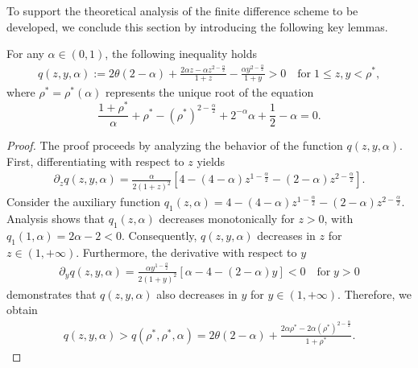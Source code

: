 \documentclass{siamart171218}
\theoremstyle{remark}
\theoremstyle{example}
\numberwithin{equation}{section}
\begin{document}
To support the theoretical analysis of the finite difference scheme to be developed, we conclude this section by introducing the following key lemmas.
\begin{lemma}\label{Le.2.2}
 For any $\alpha \in (0,1)$, the following inequality holds
\begin{align*}
q(z,y,\alpha):=2\theta(2-\alpha)+\frac{2\alpha z-\alpha z^{2-\frac{\alpha}{2}}}{1+z}-\frac{\alpha y^{2-\frac{\alpha}{2}}}{1+y}>0 \quad \text{for}\; 1\leq z,y<\rho^*,
\end{align*}
where $\rho^* = \rho^*(\alpha)$ represents the unique root of the equation $$\frac{1+\rho^*}{\alpha}+\rho^*-(\rho^*)^{2-\frac{\alpha}{2}}
+2^{-\alpha}\alpha+\frac{1}{2}-\alpha=0.$$
\end{lemma}

\begin{proof}
The proof proceeds by analyzing the behavior of the function $q(z,y,\alpha)$. First, differentiating with respect to $z$ yields
\begin{align*}
\partial_z q(z,y,\alpha)=\frac{\alpha}{2(1+z)^2}\left[4-(4-\alpha)z^{1-\frac{\alpha}{2}}
-(2-\alpha)z^{2-\frac{\alpha}{2}} \right].
\end{align*}
Consider the auxiliary function $q_1(z,\alpha)=4-(4-\alpha)z^{1-\frac{\alpha}{2}}-(2-\alpha)z^{2-\frac{\alpha}{2}}$. Analysis shows that $q_1(z,\alpha)$ decreases monotonically for $z>0$, with $q_1(1,\alpha)=2\alpha-2<0$. Consequently, $q(z,y,\alpha)$ decreases in $z$ for $z\in(1,+\infty)$. Furthermore, the derivative with respect to $y$
\begin{align*}
\partial_y q(z,y,\alpha)=\frac{\alpha y^{1-\frac{\alpha}{2}}}{2(1+y)^2}\left[\alpha-4-(2-\alpha)y \right]<0 \quad \text{for}\;y>0
\end{align*}
demonstrates that $q(z,y,\alpha)$ also decreases in $y$ for $y\in(1,+\infty)$. Therefore, we obtain
\begin{align*}
        q(z,y,\alpha) > q(\rho^*,\rho^*,\alpha) = 2\theta(2-\alpha) + \frac{2\alpha \rho^* - 2\alpha (\rho^*)^{2-\frac{\alpha}{2}}}{1+\rho^*}.
    \end{align*}


\end{proof}
\end{document}
